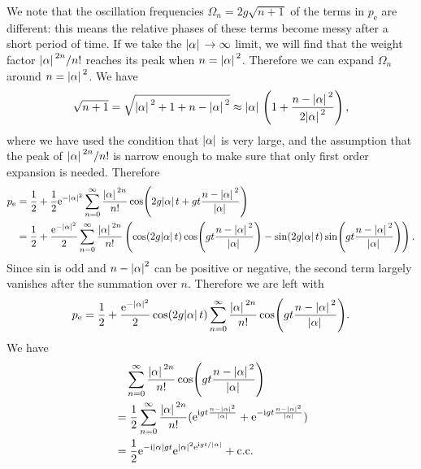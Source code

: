 \documentclass[hyperref, a4paper]{article}
\newcommand*{\ii}{\mathrm{i}}
\newcommand*{\ee}{\mathrm{e}}
\newcommand*{\pope}{p_{\text{e}}}
\begin{document}
We note that the oscillation frequencies $\Omega_n = 2 g \sqrt{n+1}$ of the terms in $\pope$ are different:
this means the relative phases of these terms become messy after a short period of time.
If we take the $\abs*{\alpha} \to \infty$ limit,
we will find that the weight factor $\abs*{\alpha}^{2n} / n!$ reaches its peak when $n = \abs*{\alpha}^2$.
Therefore we can expand $\Omega_n$ around $n = \abs*{\alpha}^2$.
We have 
\[
    \sqrt{n+1} = \sqrt{\abs*{\alpha}^2 + 1 + n - \abs*{\alpha}^2 }
    \approx \abs*{\alpha} \left( 1 + \frac{n - \abs*{\alpha}^2 }{2 \abs*{\alpha}^2} \right),
\]
where we have used the condition that $\abs{\alpha}$ is very large, 
and the assumption that the peak of  $\abs*{\alpha}^{2n} / n!$ is narrow enough 
to make sure that only first order expansion is needed.
Therefore 
\begin{equation}
    \begin{aligned}
        \pope &= \frac{1}{2} + \frac{1}{2} \ee^{- \abs*{\alpha}^2} \sum_{n=0}^{\infty} \frac{\abs*{\alpha}^{2n}}{n!} 
        \cos(
            2 g \abs*{\alpha} t + g t \frac{n - \abs*{\alpha}^2}{\abs*{\alpha}}
        ) \\
        &= \frac{1}{2} + \frac{\ee^{- \abs*{\alpha}^2}}{2} \sum_{n=0}^{\infty} \frac{\abs*{\alpha}^{2n}}{n!} 
        \left(\cos( 2 g \abs*{\alpha} t) \cos(
            g t \frac{n - \abs*{\alpha}^2 }{\abs*{\alpha}}
        ) - \sin( 2 g \abs*{\alpha} t) \sin(
            g t \frac{n - \abs*{\alpha}^2 }{\abs*{\alpha}}
        )\right).
    \end{aligned}
\end{equation}
Since sin is odd and $n - \abs{\alpha}^2$ can be positive or negative,
the second term largely vanishes after the summation over $n$.
Therefore we are left with 
\begin{equation}
    \begin{aligned}
        \pope = \frac{1}{2} + \frac{\ee^{- \abs*{\alpha}^2}}{2} 
        \cos( 2 g \abs*{\alpha} t)  \sum_{n=0}^{\infty} \frac{\abs*{\alpha}^{2n}}{n!} 
        \cos(
            g t \frac{n - \abs*{\alpha}^2 }{\abs*{\alpha}}
        ).
    \end{aligned}
\end{equation}
We have 
\[
    \begin{aligned}
        &\quad \sum_{n=0}^{\infty} \frac{\abs*{\alpha}^{2n}}{n!} 
        \cos(
            g t \frac{n - \abs*{\alpha}^2 }{\abs*{\alpha}}
        ) \\
        &= \frac{1}{2} \sum_{n=0}^{\infty} \frac{\abs*{\alpha}^{2n}}{n!} 
        (
            \ee^{\ii g t \frac{n - \abs*{\alpha}^2 }{\abs*{\alpha}}}
            + \ee^{-\ii g t \frac{n - \abs*{\alpha}^2 }{\abs*{\alpha}}}
        ) \\
        &= \frac{1}{2} \ee^{- \ii \abs{\alpha} g t} \ee^{\abs{\alpha}^2 \ee^{\ii g t / \abs{\alpha}}} + \text{c.c.}
    \end{aligned}
\]
\end{document}
